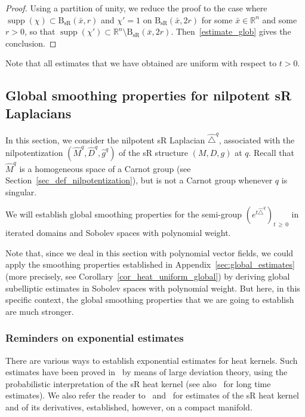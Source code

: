 \documentclass[10pt]{amsart}
\theoremstyle{definition}\newtheorem{defi}[theo]{Definition}\newtheorem{rema}[theo]{Remark}\newtheorem{exam}[theo]{Example}\newtheorem{exem}[theo]{Example}\newtheorem{nota}[theo]{Notation}
\newcommand*\R{\mathbb{R}}
\DeclareMathOperator{\supp}{supp}
\newcommand{\BsR}{\mathrm{B}_{\mathrm{sR}}}
\renewcommand{\geq}{\geqslant}
\begin{document}
\begin{proof}
Using a partition of unity, we reduce the proof to the case where $\supp(\chi)\subset\BsR(\bar x,r)$ and $\chi'=1$ on $\BsR(\bar x,2r)$ for some $\bar x\in\R^n$ and some $r>0$, so that $\supp(\chi')\subset\R^n\setminus\BsR(\bar x,2r)$. Then~\eqref{estimate_glob} gives the conclusion.
\end{proof}

Note that all estimates that we have obtained are uniform with respect to $t>0$.



\subsection{Global smoothing properties for nilpotent sR Laplacians}\label{sec:global_estimates_sR_weight}
In this section, we consider the nilpotent sR Laplacian $\widehat{\triangle}^q$, associated with the nilpotentization $(\widehat{M}^q,\widehat{D}^q,\widehat{g}^q)$ of the sR structure $(M,D,g)$ at $q$. Recall that $\widehat{M}^q$ is a homogeneous space of a Carnot group (see Section~\ref{sec_def_nilpotentization}), but is not a Carnot group whenever $q$ is singular.

We will establish global smoothing properties for the semi-group $(e^{t\widehat{\triangle}^q})_{t\,\geq\,0}$ in iterated domains and Sobolev spaces with polynomial weight.

Note that, since we deal in this section with polynomial vector fields, we could apply the smoothing properties established in Appendix~\ref{sec:global_estimates} (more precisely, see Corollary~\ref{cor_heat_uniform_global}) by deriving global subelliptic estimates in Sobolev spaces with polynomial weight. But here, in this specific context, the global smoothing properties that we are going to establish are much stronger.


\subsubsection{Reminders on exponential estimates}
There are various ways to establish exponential estimates for heat kernels. Such estimates have been proved in~\cite{Varopoulos} by means of large deviation theory, using the probabilistic interpretation of the sR heat kernel (see also~\cite{KusuokaStroock} for long time estimates). We also refer the reader to~\cite{Sac-84} and~\cite{Je-Sa-86} for estimates of the sR heat kernel and of its derivatives, established, however, on a compact manifold.
\end{document}
